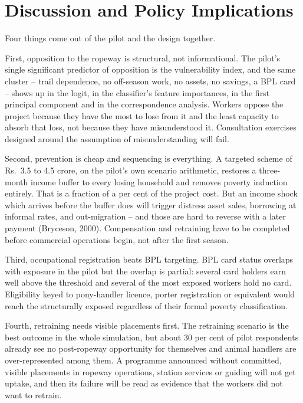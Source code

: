 \documentclass[11pt]{article}
\begin{document}
\section{Discussion and Policy Implications}\label{sec:policy}

Four things come out of the pilot and the design together.

First, opposition to the ropeway is structural, not informational. The pilot's single
significant predictor of opposition is the vulnerability index, and the same cluster --
trail dependence, no off-season work, no assets, no savings, a BPL card -- shows up in the
logit, in the classifier's feature importances, in the first principal component and in the
correspondence analysis. Workers oppose the project because they have the most to lose from it
and the least capacity to absorb that loss, not because they have misunderstood it. Consultation
exercises designed around the assumption of misunderstanding will fail.

Second, prevention is cheap and sequencing is everything. A targeted scheme of Rs.\ 3.5 to 4.5
crore, on the pilot's own scenario arithmetic, restores a three-month income buffer to every
losing household and removes poverty induction entirely. That is a fraction of a per cent of the
project cost. But an income shock which arrives before the buffer does will trigger distress
asset sales, borrowing at informal rates, and out-migration -- and those are hard to reverse
with a later payment (Bryceson, 2000). Compensation and retraining have to be completed before
commercial operations begin, not after the first season.

Third, occupational registration beats BPL targeting. BPL card status overlaps with exposure in
the pilot but the overlap is partial: several card holders earn well above the threshold and
several of the most exposed workers hold no card. Eligibility keyed to pony-handler licence,
porter registration or equivalent would reach the structurally exposed regardless of their
formal poverty classification.

Fourth, retraining needs visible placements first. The retraining scenario is the best outcome
in the whole simulation, but about 30 per cent of pilot respondents already see no post-ropeway
opportunity for themselves and animal handlers are over-represented among them. A programme
announced without committed, visible placements in ropeway operations, station services or
guiding will not get uptake, and then its failure will be read as evidence that the workers did
not want to retrain.
\end{document}
